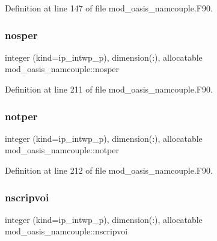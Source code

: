 Definition at line 147 of file mod\+\_\+oasis\+\_\+namcouple.\+F90.

\mbox{\label{namespacemod__oasis__namcouple_a484a71c213c89416924a0e23cfd46269}} 
\subsubsection{\texorpdfstring{nosper}{nosper}}
{\footnotesize\ttfamily integer (kind=ip\+\_\+intwp\+\_\+p), dimension(\+:), allocatable mod\+\_\+oasis\+\_\+namcouple\+::nosper\hspace{0.3cm}{\ttfamily [private]}}



Definition at line 211 of file mod\+\_\+oasis\+\_\+namcouple.\+F90.

\mbox{\label{namespacemod__oasis__namcouple_ac154fc90756832bc90d02ea21f7c7e17}} 
\subsubsection{\texorpdfstring{notper}{notper}}
{\footnotesize\ttfamily integer (kind=ip\+\_\+intwp\+\_\+p), dimension(\+:), allocatable mod\+\_\+oasis\+\_\+namcouple\+::notper\hspace{0.3cm}{\ttfamily [private]}}



Definition at line 212 of file mod\+\_\+oasis\+\_\+namcouple.\+F90.

\mbox{\label{namespacemod__oasis__namcouple_abb6f67bfba2cba424dabee3a465fdfd5}} 
\subsubsection{\texorpdfstring{nscripvoi}{nscripvoi}}
{\footnotesize\ttfamily integer (kind=ip\+\_\+intwp\+\_\+p), dimension(\+:), allocatable mod\+\_\+oasis\+\_\+namcouple\+::nscripvoi\hspace{0.3cm}{\ttfamily [private]}}



